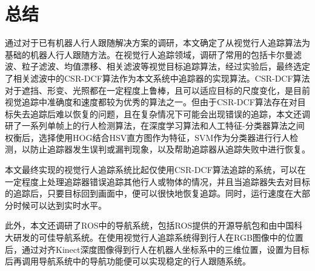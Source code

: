
\chapter{总结}

  通过对于已有机器人行人跟随解决方案的调研，本文确定了从视觉行人追踪算法为基础的机器人行人跟随方法。在视觉行人追踪领域，调研了常用的包括卡尔曼滤波、粒子滤波、均值漂移、相关滤波等视觉目标追踪算法，经过实验后，最终选定了相关滤波中的CSR-DCF算法作为本文系统中追踪器的实现算法。CSR-DCF算法对于遮挡、形变、光照都在一定程度上鲁棒，且可以适应目标的尺度变化，是目前视觉追踪中准确度和速度都较为优秀的算法之一。但由于CSR-DCF算法存在对目标失去追踪后难以恢复的问题，且在复杂情况下可能会出现错误的追踪，本文还调研了一系列单帧上的行人检测算法，在深度学习算法和人工特征-分类器算法之间权衡后，选择使用HOG结合HSV直方图作为特征，SVM作为分类器进行行人检测，以防止追踪器发生误判或漏判现象，以及帮助追踪器从追踪失败中进行恢复。

  本文最终实现的视觉行人追踪系统比起仅使用CSR-DCF算法追踪的系统，可以在一定程度上处理追踪器错误追踪其他行人或物体的情况，并且当追踪器失去对目标的追踪后，只要目标回到画面中，便可以很快地恢复追踪。同时，运行速度在大部分时候可以达到实时水平。

  此外，本文还调研了ROS中的导航系统，包括ROS提供的开源导航包和由中国科大研发的可佳导航系统。在使用视觉行人追踪系统得到行人在RGB图像中的位置后，通过对齐Kinect深度图像得到行人在机器人坐标系中的三维位置，设置为目标后再调用导航系统中的导航功能便可以实现稳定的行人跟随系统。